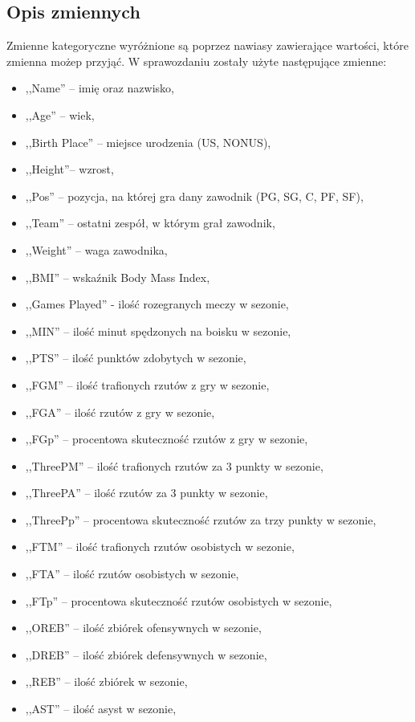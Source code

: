 \documentclass[11pt,a4paper]{article}
\begin{document}
\subsection{Opis zmiennych}
Zmienne kategoryczne wyróżnione są poprzez nawiasy zawierające wartości, które zmienna możep przyjąć. W sprawozdaniu zostały użyte następujące zmienne:
\begin{itemize}
	\item ,,Name'' -- imię oraz nazwisko,
	\item ,,Age'' -- wiek,
	\item ,,Birth Place'' -- miejsce urodzenia (US, NONUS),
	\item ,,Height''-- wzrost,
	\item ,,Pos'' -- pozycja, na której gra dany zawodnik (PG, SG, C, PF, SF),
	\item ,,Team'' -- ostatni zespół, w którym grał zawodnik,
	\item ,,Weight'' -- waga zawodnika,	
	\item ,,BMI'' -- wskaźnik Body Mass Index, 
	\item ,,Games Played'' - ilość rozegranych meczy w sezonie,	
	\item ,,MIN'' -- ilość minut spędzonych na boisku w sezonie,
	\item ,,PTS'' -- ilość punktów zdobytych w sezonie,
	\item ,,FGM'' -- ilość trafionych rzutów z gry w sezonie,
	\item ,,FGA'' -- ilość rzutów z gry w sezonie,
	\item ,,FGp'' -- procentowa skuteczność rzutów z gry w sezonie,
	\item ,,ThreePM'' -- ilość trafionych rzutów za 3 punkty w sezonie,
	\item ,,ThreePA'' -- ilość rzutów za 3 punkty w sezonie,
	\item ,,ThreePp'' -- procentowa skuteczność rzutów za trzy punkty w sezonie,
	\item ,,FTM'' -- ilość trafionych rzutów osobistych w sezonie,
	\item ,,FTA'' -- ilość rzutów osobistych w sezonie,
	\item ,,FTp'' -- procentowa skuteczność rzutów osobistych w sezonie,
	\item ,,OREB'' -- ilość zbiórek ofensywnych w sezonie,	
	\item ,,DREB'' -- ilość zbiórek defensywnych w sezonie,	
	\item ,,REB'' -- ilość zbiórek w sezonie,
	\item ,,AST'' -- ilość asyst w sezonie,

\end{itemize}
\end{document}
